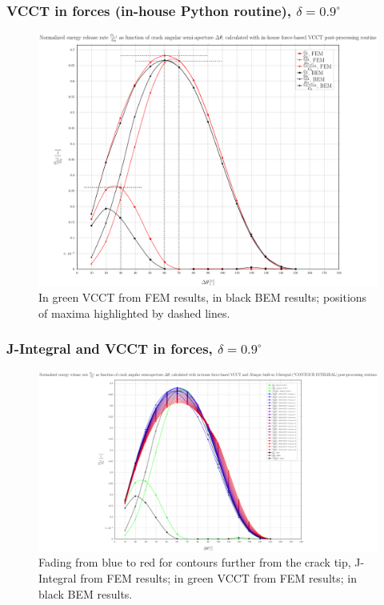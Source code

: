 \documentclass[first,firstsupp,lastsupp,handout,last,hyperref,table]{ETHclass}
\begin{document}
\begin{frame}
\frametitle{\small VCCT in forces (in-house Python routine), $\delta=0.9^{\circ}$}
\vspace{-0.5cm}
\centering
\captionsetup[figure]{font=scriptsize,labelfont=scriptsize}
\begin{figure}[!h]
\centering
\includegraphics[height=0.7\textheight]{2017-07-10_AbqRunSummary_SmallStrainD09_M-F-VCCT_Summary.pdf}
  \caption{\scriptsize In green VCCT from FEM results, in black BEM results; positions of maxima highlighted by dashed lines.}
  \label{fig:res1}
\end{figure}
\end{frame}

\begin{frame}
\frametitle{\small J-Integral and VCCT in forces, $\delta=0.9^{\circ}$}
\vspace{-0.5cm}
\centering
\captionsetup[figure]{font=scriptsize,labelfont=scriptsize}
\begin{figure}[!h]
\centering
\includegraphics[height=0.7\textheight]{2017-07-10_AbqRunSummary_SmallStrainD09_F-VCCT-JINT_Summary.pdf}
  \caption{\scriptsize Fading from blue to red for contours further from the crack tip, J-Integral from FEM results; in green VCCT from FEM results; in black BEM results.}
  \label{fig:res1}
\end{figure}
\end{frame}
\end{document}
